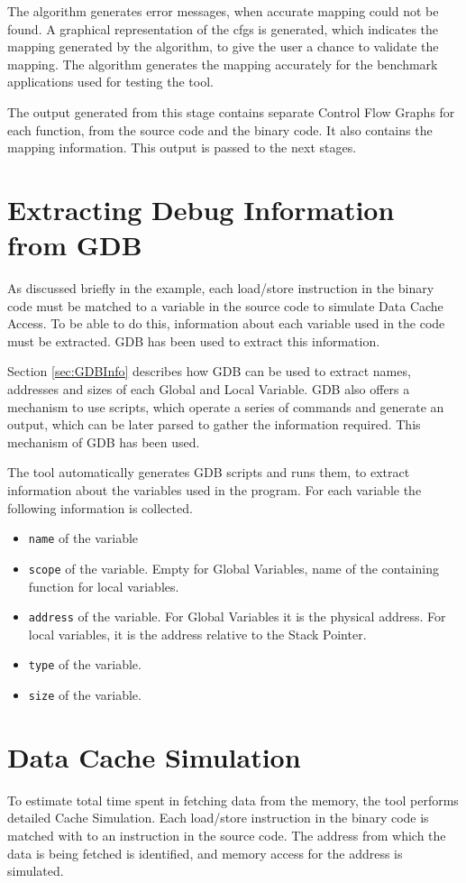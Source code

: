 The algorithm generates error messages, when accurate mapping could not be found. A graphical representation of the \gls{cfg}s is generated, which indicates the mapping generated by the algorithm, to give the user a chance to validate the mapping. The algorithm generates the mapping accurately for the benchmark applications used for testing the tool.

The output generated from this stage contains separate Control Flow Graphs for each function, from the source code and the binary code. It also contains the mapping information. This output is passed to the next stages.

\section{Extracting Debug Information from GDB}
\label{sec:C3GDBInfo}
As discussed briefly in the example, each load/store instruction in the binary code must be matched to a variable in the source code to simulate Data Cache Access. To be able to do this, information about each variable used in the code must be extracted. GDB has been used to extract this information.

Section \ref{sec:GDBInfo} describes how GDB can be used to extract names, addresses and sizes of each Global and Local Variable. GDB also offers a mechanism to use scripts, which operate a series of commands and generate an output, which can be later parsed to gather the information required. This mechanism of GDB has been used.

The tool automatically generates GDB scripts and runs them, to extract information about the variables used in the program. For each variable the following information is collected.

\begin{itemize} \itemsep -6pt
\item \texttt{name} of the variable
\item \texttt{scope} of the variable. Empty for Global Variables, name of the containing function for local variables.
\item \texttt{address} of the variable. For Global Variables it is the physical address. For local variables, it is the address relative to the Stack Pointer.
\item \texttt{type} of the variable.
\item \texttt{size} of the variable.
\end{itemize}

\section{Data Cache Simulation}
To estimate total time spent in fetching data from the memory, the tool performs detailed Cache Simulation. Each load/store instruction in the binary code is matched with to an instruction in the source code. The address from which the data is being fetched is identified, and memory access for the address is simulated. 

